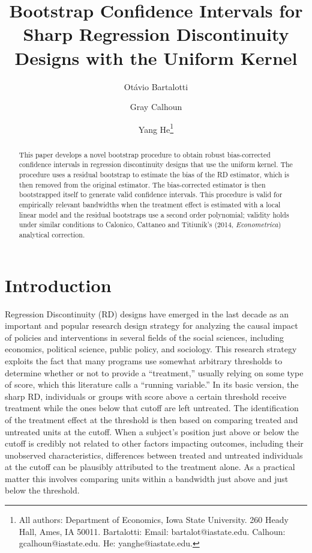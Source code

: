 \documentclass[12pt,fleqn]{article}
\title{Bootstrap Confidence Intervals for Sharp Regression Discontinuity Designs
  with the Uniform Kernel}
\author{Ot\'avio Bartalotti \and Gray Calhoun \and Yang He\thanks{All authors:
Department of Economics, Iowa State University. 260 Heady Hall, Ames, IA  50011.
Bartalotti: Email: bartalot@iastate.edu. Calhoun: gcalhoun@iastate.edu.
He: yanghe@iastate.edu.}}
\begin{document}
\maketitle

\begin{abstract}\noindent
  This paper develops a novel bootstrap procedure to obtain robust
  bias-corrected confidence intervals in regression discontinuity designs that
  use the uniform kernel. The procedure uses a residual bootstrap to estimate
  the bias of the RD estimator, which is then removed from the original
  estimator.  The bias-corrected estimator is then bootstrapped itself to
  generate valid confidence intervals. This procedure is valid for empirically
  relevant bandwidths when the treatment effect is estimated with a local linear
  model and the residual bootstraps use a second order polynomial; validity
  holds under similar conditions to Calonico, Cattaneo and Titiunik's (2014,
  \textit{Econometrica}) analytical correction.
\end{abstract}

\section{Introduction}
Regression Discontinuity (RD) designs have emerged in the last decade as an
important and popular research design strategy for analyzing the causal impact
of policies and interventions in several fields of the social sciences,
including economics, political science, public policy, and sociology.
This research strategy exploits the fact that many programs use somewhat
arbitrary thresholds to determine whether or not to provide a ``treatment,''
usually relying on some type of score, which this literature calls a ``running
variable.'' In its basic version, the sharp RD,  individuals or groups with score above a
certain threshold receive treatment while the ones below that cutoff are left
untreated.
The identification of the treatment effect at the threshold is then based on
comparing treated and untreated units at the cutoff. When a subject's
position just above or below the cutoff is credibly not related to
other factors impacting outcomes, including their unobserved
characteristics, differences between treated and untreated individuals
at the cutoff can be plausibly attributed to the treatment alone. As a
practical matter this involves comparing units within a bandwidth just
above and just below the threshold.
\end{document}
